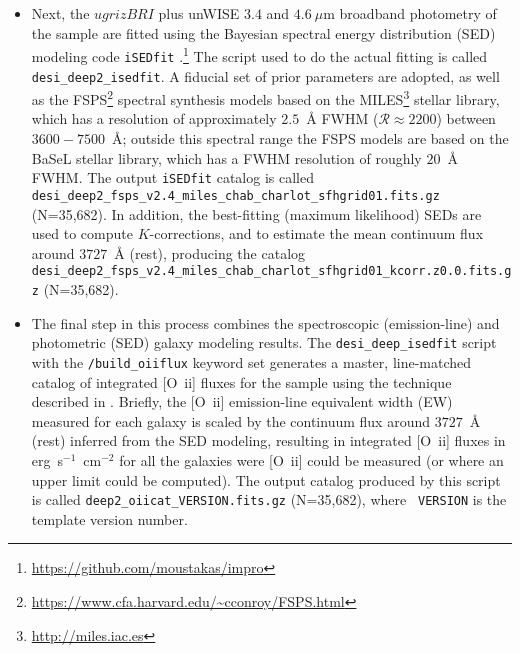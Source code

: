 \documentclass[12pt]{article}
\newcommand{\oii}{[O~{\sc ii}]}
\begin{document}
\begin{itemize}
\item{Next, the $ugrizBRI$ plus unWISE $3.4$ and $4.6~\mu$m broadband
  photometry of the sample are fitted using the Bayesian spectral
  energy distribution (SED) modeling code {\tt iSEDfit}
  \citep{moustakas13a}.\footnote{\url{https://github.com/moustakas/impro}}
  The script used to do the actual fitting is called {\tt
    desi\_deep2\_isedfit}.  A fiducial set of prior parameters are
  adopted, as well as the
  FSPS\footnote{\url{https://www.cfa.harvard.edu/~cconroy/FSPS.html}}
  \citep[v2.4;][]{conroy09a, conroy10b} spectral synthesis models
  based on the MILES\footnote{\url{http://miles.iac.es}} stellar
  library, which has a resolution of approximately $2.5$~\AA{} FWHM
  ($\mathcal{R}\approx2200$) between $3600-7500$~\AA; outside this
  spectral range the FSPS models are based on the BaSeL stellar
  library, which has a FWHM resolution of roughly $20$~\AA{} FWHM.
  The output {\tt iSEDfit} catalog is called {\tt
    desi\_deep2\_fsps\_v2.4\_miles\_chab\_charlot\_sfhgrid01.fits.gz}
  (N=35,682).  In addition, the best-fitting (maximum likelihood) SEDs
  are used to compute $K$-corrections, and to estimate the mean
  continuum flux around $3727$~\AA{} (rest), producing the catalog
  {\tt
    desi\_deep2\_fsps\_v2.4\_miles\_chab\_charlot\_sfhgrid01\_kcorr.z0.0.fits.gz}
  (N=35,682).}

\item{The final step in this process combines the spectroscopic
  (emission-line) and photometric (SED) galaxy modeling results.  The
  {\tt desi\_deep\_isedfit} script with the {\tt /build\_oiiflux}
  keyword set generates a master, line-matched catalog of integrated
  \oii{} fluxes for the sample using the technique described in
  \citet{zhu09a}.  Briefly, the \oii{} emission-line equivalent width
  (EW) measured for each galaxy is scaled by the continuum flux around
  $3727$~\AA{} (rest) inferred from the SED modeling, resulting in
  integrated \oii{} fluxes in erg~s$^{-1}$~cm$^{-2}$ for all the
  galaxies were \oii{} could be measured (or where an upper limit
  could be computed).  The output catalog produced by this script is
  called {\tt deep2\_oiicat\_VERSION.fits.gz} (N=35,682), where {\tt
    VERSION} is the template version number.}
\end{itemize}

\end{document}
